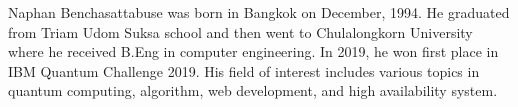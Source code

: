 \begin{biography}
Naphan Benchasattabuse was born in Bangkok on December, 1994. He graduated from Triam Udom Suksa school and then went to Chulalongkorn University where he received B.Eng in computer engineering. In 2019, he won first place in IBM Quantum Challenge 2019. His field of interest includes various topics in quantum computing, algorithm, web development, and high availability system. 
\end{biography}

